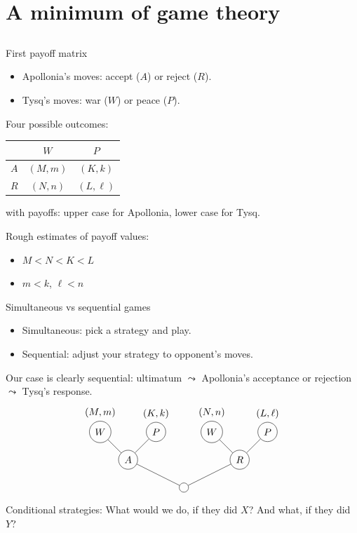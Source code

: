 \documentclass[compress]{beamer}
\begin{document}
\section{A minimum of game theory}
\subsection{}

\begin{frame}{First payoff matrix}
\begin{itemize}
\item Apollonia's moves: \alert{accept} ($A$) or \alert{reject} ($R$). 
\item Tysq's moves: \alert{war} ($W$) or \alert{peace} ($P$).
\end{itemize}  
Four possible outcomes: 
\begin{center}
\begin{tabular}{c|cc}
  & $W$      & $P$ \\
\hline
$A$ & $(M,m)$  & $(K,k)$  \\
$R$ & $(N,n)$  & $(L,\ell)$  
\end{tabular}
\end{center}
with payoffs: upper case for Apollonia, lower case for Tysq. 

\begin{block}{Rough estimates of payoff values:}
\begin{itemize}  
\item $M<N<K<L$
\item $m < k$, $\ell < n$
\end{itemize}
\end{block}

\end{frame}

\begin{frame}{Simultaneous vs sequential games}

\begin{itemize}
\item Simultaneous: pick a strategy and play. 
\item Sequential: adjust your strategy to opponent's moves.
\end{itemize}  
Our case is clearly sequential: ultimatum $\leadsto$ Apollonia's acceptance or
rejection $\leadsto$ Tysq's response. 
$$
\begin{tikzpicture}
\path node (v0) at (0,0) [circle,draw] {} 
node (v1) at (-2,1) [circle,draw] {$A$} 
node (v2) at (-3,2) [circle,draw,label=above:{$(M,m)$}] {$W$} 
node (v3) at (-1,2) [circle,draw,label=above:{$(K,k)$}] {$P$} 
node (v4) at (1,2) [circle,draw,label=above:{$(N,n)$}] {$W$} 
node (v5) at (3,2) [circle,draw,label=above:{$(L,\ell)$}] {$P$} 
node (v6) at (2,1) [circle,draw] {$R$};
\draw (v0) -- (v1) -- (v2);
\draw (v1) -- (v3);
\draw (v0) -- (v6) -- (v5);
\draw (v6) -- (v4);
\end{tikzpicture}
$$
\alert{Conditional strategies:}
What would we do, if they did $X$? And what, if they did $Y$? 
\end{frame}  
\end{document}
